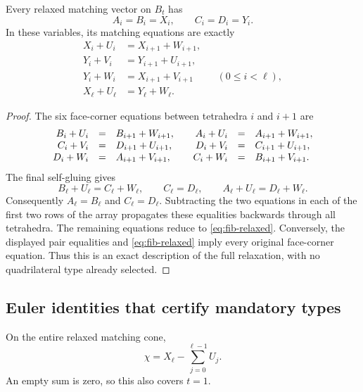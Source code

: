 \begin{lemma}
\label{lem:fib-relaxed}
Every relaxed matching vector on $B_t$ has
\[
 A_i=B_i=X_i,\qquad C_i=D_i=Y_i.
\]
In these variables, its matching equations are exactly
\begin{equation}
\begin{aligned}
 X_i+U_i&=X_{i+1}+W_{i+1},\\
 Y_i+V_i&=Y_{i+1}+U_{i+1},\\
 Y_i+W_i&=X_{i+1}+V_{i+1}
       &&(0\le i<\ell),\\
 X_\ell+U_\ell&=Y_\ell+W_\ell.
\end{aligned}
\label{eq:fib-relaxed}
\end{equation}
\end{lemma}

\begin{proof}
The six face-corner equations between tetrahedra $i$ and $i+1$ are
\[
\begin{array}{rcl@{\qquad}rcl}
 B_i+U_i&=&B_{i+1}+W_{i+1},&
 A_i+U_i&=&A_{i+1}+W_{i+1},\\
 C_i+V_i&=&D_{i+1}+U_{i+1},&
 D_i+V_i&=&C_{i+1}+U_{i+1},\\
 D_i+W_i&=&A_{i+1}+V_{i+1},&
 C_i+W_i&=&B_{i+1}+V_{i+1}.
\end{array}
\]
The final self-gluing gives
\[
 B_\ell+U_\ell=C_\ell+W_\ell,\qquad
 C_\ell=D_\ell,\qquad
 A_\ell+U_\ell=D_\ell+W_\ell.
\]
Consequently $A_\ell=B_\ell$ and $C_\ell=D_\ell$.  Subtracting the two
equations in each of the first two rows of the array propagates these
equalities backwards through all tetrahedra.  The remaining equations reduce
to \eqref{eq:fib-relaxed}.  Conversely, the displayed pair equalities and
\eqref{eq:fib-relaxed} imply every original face-corner equation.  Thus this
is an exact description of the full relaxation, with no quadrilateral type
already selected.
\end{proof}

\subsection{Euler identities that certify mandatory types}

\begin{lemma}
\label{lem:fib-euler}
On the entire relaxed matching cone,
\begin{equation}
 \chi=X_\ell-\sum_{j=0}^{\ell-1}U_j.
 \label{eq:fib-euler}
\end{equation}
An empty sum is zero, so this also covers $t=1$.
\end{lemma}

